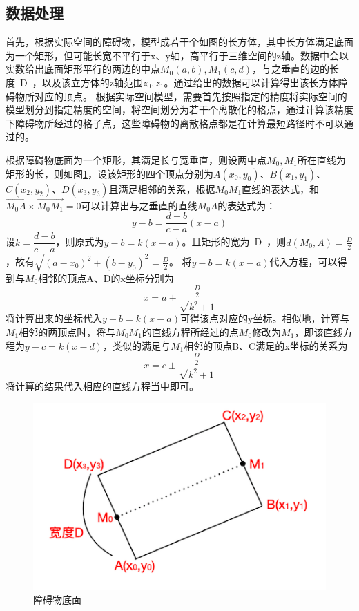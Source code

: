 \subsection{数据处理}
\par 首先，根据实际空间的障碍物，模型成若干个如图的长方体，其中长方体满足底面为一个矩形，但可能长宽不平行于x、y轴，高平行于三维空间的z轴。数据中会以实数给出底面矩形平行的两边的中点$M_0(a,b),M_1(c,d)$，与之垂直的边的长度~D~，以及该立方体的z轴范围$z_0,z_1$。通过给出的数据可以计算得出该长方体障碍物所对应的顶点。
根据实际空间模型，需要首先按照指定的精度将实际空间的模型划分到指定精度的空间，将空间划分为若干个离散化的格点，通过计算该精度下障碍物所经过的格子点，这些障碍物的离散格点都是在计算最短路径时不可以通过的。
\par 根据障碍物底面为一个矩形，其满足长与宽垂直，则设两中点$M_0,M_1$所在直线为矩形的长，则如图\ref{fig:obstacle_bottom}，设该矩形的四个顶点分别为$A(x_0,y_0)$、$B(x_1,y_1)$、$C(x_2,y_2)$、$D(x_3,y_3)$且满足相邻的关系，根据$M_0M_1$直线的表达式，和$\vec{M_0A}\times\vec{M_0M_1}=0$可以计算出与之垂直的直线$M_0A$的表达式为：
$$
    y-b=\dfrac{d-b}{c-a}(x-a)
$$
设$k=\dfrac{d-b}{c-a}$，则原式为$y-b=k(x-a)$。且矩形的宽为~D~，则$d(M_0,A)=\frac{D}{2}$，故有$\sqrt{(a-x_0)^2+(b-y_0)^2}=\frac{D}{2}$。
将$y-b=k(x-a)$代入方程，可以得到与$M_0$相邻的顶点A、D的x坐标分别为
$$
    x=a\pm\dfrac{\frac{D}{2}}{\sqrt{k^2+1}}
$$
将计算出来的坐标代入$y-b=k(x-a)$可得该点对应的y坐标。相似地，计算与$M_1$相邻的两顶点时，将与$M_0M_1$的直线方程所经过的点$M_0$修改为$M_1$，即该直线方程为$y-c=k(x-d)$，类似的满足与$M_1$相邻的顶点B、C满足的x坐标的关系为
$$
    x=c\pm\dfrac{\frac{D}{2}}{\sqrt{k^2+1}}
$$
将计算的结果代入相应的直线方程当中即可。
\begin{figure}[htbp]
    \centering
    \includegraphics[width=12cm]{figures/obstacle_bottom.png}
    \caption{障碍物底面}
    \label{fig:obstacle_bottom}
\end{figure}
